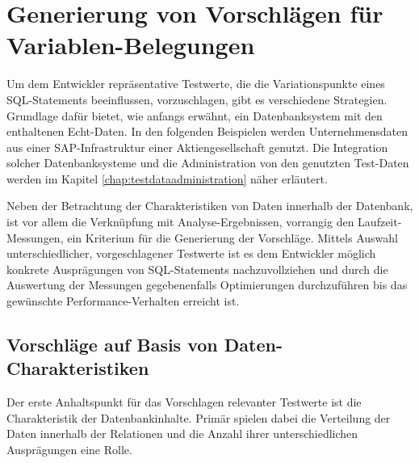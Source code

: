 \section{Generierung von Vorschlägen für Variablen-Belegungen}\label{chap:testdatasuggestions}

%
%


Um dem Entwickler repräsentative Testwerte, die die Variationspunkte eines SQL-Statements beeinflussen, vorzuschlagen, gibt es verschiedene Strategien.
Grundlage dafür bietet, wie anfangs erwähnt, ein Datenbanksystem mit den enthaltenen Echt-Daten.
In den folgenden Beispielen werden Unternehmensdaten aus einer SAP-Infrastruktur einer Aktiengesellschaft genutzt.
Die Integration solcher Datenbanksysteme und die Administration von den genutzten Test-Daten werden im Kapitel \ref{chap:testdataadministration} näher erläutert.

Neben der Betrachtung der Charakteristiken von Daten innerhalb der Datenbank, ist vor allem die Verknüpfung mit Analyse-Ergebnissen, vorrangig den Laufzeit-Messungen, ein Kriterium für die Generierung der Vorschläge.
Mittels Auswahl unterschiedlicher, vorgeschlagener Testwerte ist es dem Entwickler möglich konkrete Ausprägungen von SQL-Statements nachzuvollziehen und durch die Auswertung der Messungen gegebenenfalls Optimierungen durchzuführen bis das gewünschte Performance-Verhalten erreicht ist.


\subsection{Vorschläge auf Basis von Daten-Charakteristiken}\label{chap:datacharacteristics}
Der erste Anhaltspunkt für das Vorschlagen relevanter Testwerte ist die Charakteristik der Datenbankinhalte.
Primär spielen dabei die Verteilung der Daten innerhalb der Relationen und die Anzahl ihrer unterschiedlichen Ausprägungen eine Rolle.


